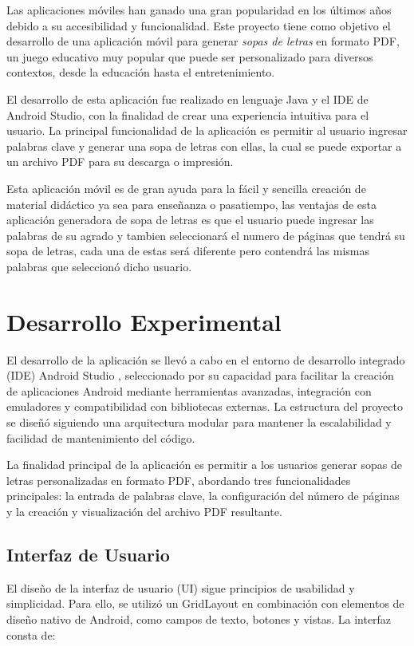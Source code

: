 \documentclass[conference]{IEEEtran}
\begin{document}
Las aplicaciones móviles han ganado una gran popularidad en los últimos años debido a su accesibilidad y funcionalidad. Este proyecto tiene como objetivo el desarrollo de una aplicación móvil para generar  \textit{sopas de letras} en formato PDF, un juego educativo muy popular que puede ser personalizado para diversos contextos, desde la educación hasta el entretenimiento.

El desarrollo de esta aplicación fue realizado en lenguaje Java y el IDE de Android Studio, con la finalidad de crear una experiencia intuitiva para el usuario. La principal funcionalidad de la aplicación es permitir al usuario ingresar palabras clave y generar una sopa de letras con ellas, la cual se puede exportar a un archivo PDF para su descarga o impresión.

Esta aplicación móvil es de gran ayuda para la fácil y sencilla creación de material didáctico ya sea para enseñanza o pasatiempo, las ventajas de esta aplicación generadora de sopa de letras es que el usuario puede ingresar las palabras de su agrado y tambien seleccionará el numero de páginas que tendrá su sopa de letras, cada una de estas será diferente pero contendrá las mismas palabras que seleccionó dicho usuario. 


\section{Desarrollo Experimental}
El desarrollo de la aplicación se llevó a cabo en el entorno de desarrollo integrado (IDE) Android Studio \cite{androidstudio}, seleccionado por su capacidad para facilitar la creación de aplicaciones Android mediante herramientas avanzadas, integración con emuladores y compatibilidad con bibliotecas externas. La estructura del proyecto se diseñó siguiendo una arquitectura modular para mantener la escalabilidad y facilidad de mantenimiento del código.

La finalidad principal de la aplicación es permitir a los usuarios generar sopas de letras personalizadas en formato PDF, abordando tres funcionalidades principales: la entrada de palabras clave, la configuración del número de páginas y la creación y visualización del archivo PDF resultante.

\subsection{Interfaz de Usuario} El diseño de la interfaz de usuario (UI) sigue principios de usabilidad y simplicidad. Para ello, se utilizó un GridLayout en combinación con elementos de diseño nativo de Android, como campos de texto, botones y vistas. La interfaz consta de:
\end{document}
